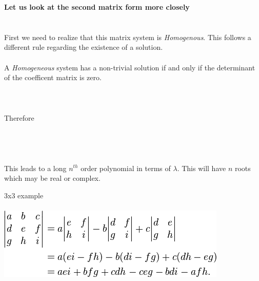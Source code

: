 \documentclass[11pt]{article}
\begin{document}
\begin{itemize}
{		 	

\newpage
\item  \textbf{\LARGE Let us look at the second matrix form more closely}\\\\

 \\

First we need to realize that this matrix system is {\it Homogenous}. This follows a different rule regarding the existence of a solution.\\\\
 A {\it Homogeneous} system has a non-trivial solution if and only if the determinant of the coefficent matrix is zero.\\\\

\\\\

Therefore\\\\\\
 \\\\

This leads to a long $n^{th}$ order polynomial in terms of $\lambda$. This will have $n$ roots which may be real or complex.
\newpage
\item 3x3 example \\\\
\includegraphics[scale=1]{lecture5_fig1.png}

}
\end{itemize}
\end{document}
